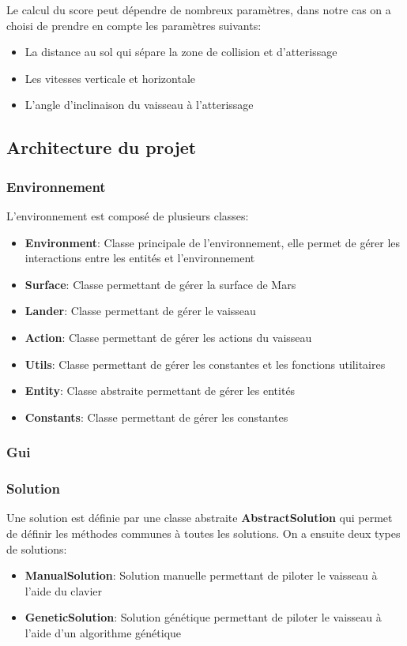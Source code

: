 \documentclass[french,a4paper,10pt,twocolumn]{article}
\begin{document}
Le calcul du score peut dépendre de nombreux paramètres, dans notre cas on a choisi de prendre en compte les paramètres suivants:
\begin{itemize}
    \item La distance au sol qui sépare la zone de collision et d'atterissage
    \item Les vitesses verticale et horizontale 
    \item L'angle d'inclinaison du vaisseau à l'atterissage
\end{itemize}

\subsection{Architecture du projet}

\subsubsection{Environnement}

L'environnement est composé de plusieurs classes:
\begin{itemize}
    \item \textbf{Environment}: Classe principale de l'environnement, elle permet de gérer les interactions entre les entités et l'environnement
    \item \textbf{Surface}: Classe permettant de gérer la surface de Mars
    \item \textbf{Lander}: Classe permettant de gérer le vaisseau
    \item \textbf{Action}: Classe permettant de gérer les actions du vaisseau
    \item \textbf{Utils}: Classe permettant de gérer les constantes et les fonctions utilitaires
    \item \textbf{Entity}: Classe abstraite permettant de gérer les entités
    \item \textbf{Constants}: Classe permettant de gérer les constantes
\end{itemize}

\subsubsection{Gui}

\subsubsection{Solution}

Une solution est définie par une classe abstraite \textbf{AbstractSolution} qui permet de définir les méthodes communes à toutes les solutions.
On a ensuite deux types de solutions:
\begin{itemize}
    \item \textbf{ManualSolution}: Solution manuelle permettant de piloter le vaisseau à l'aide du clavier
    \item \textbf{GeneticSolution}: Solution génétique permettant de piloter le vaisseau à l'aide d'un algorithme génétique
\end{itemize}



\pagebreak
\printbibliography
\end{document}
